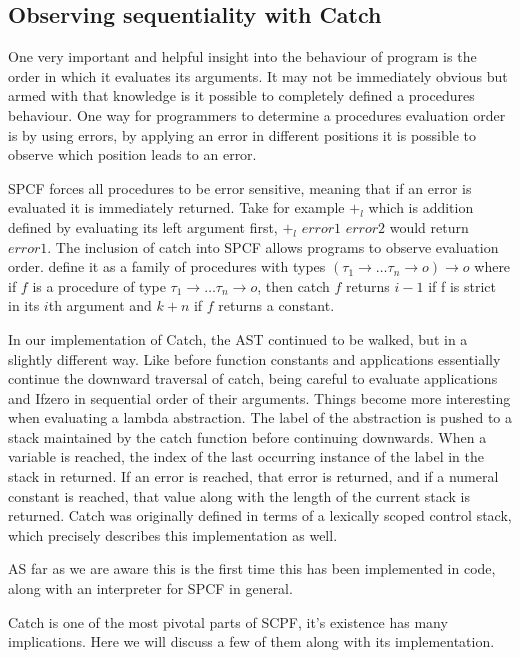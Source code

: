 \documentclass[12pt,a4paper]{report}
\theoremstyle{definition}
\theoremstyle{remark}
\begin{document}
\subsection{Observing sequentiality with Catch}
One very important and helpful insight into the behaviour of program is the order in which it evaluates its arguments. It may not be immediately obvious but armed with that knowledge is it possible to completely defined a procedures behaviour. One way for programmers to determine a procedures evaluation order is by using errors, by applying an error in different positions it is possible to observe which position leads to an error.

SPCF forces all procedures to be error sensitive, meaning that if an error is evaluated it is immediately returned. Take for example $+_l$ which is addition defined by evaluating its left argument first, $+_l$ $error1$ $error2$ would return $error1$. The inclusion of catch into SPCF allows programs to observe evaluation order. \cite{cartwright_1992} define it as a family of procedures with types $(\tau_1 \rightarrow \dots \tau_n \rightarrow o) \rightarrow o$ where if $f$ is a procedure of type $\tau_1 \rightarrow \dots \tau_n \rightarrow o$, then catch $f$ returns $i - 1$ if f is strict in its $i$th argument and $k+n$ if $f$ returns a constant. 

In our implementation of Catch, the AST continued to be walked, but in a slightly different way. Like before function constants and applications essentially continue the downward traversal of catch, being careful to evaluate applications and Ifzero in sequential order of their arguments. Things become more interesting when evaluating a lambda abstraction. The label of the abstraction is pushed to a stack maintained by the catch function before continuing downwards. When a variable is reached, the index of the last occurring instance of the label in the stack in returned. If an error is reached, that error is returned, and if a numeral constant is reached,  that value along with the length of the current stack is returned. Catch was originally defined in terms of a lexically scoped control stack, which precisely describes this implementation as well.

AS far as we are aware this is the first time this has been implemented in code, along with an interpreter for SPCF in general.

Catch is one of the most pivotal parts of SCPF, it's existence has many implications. Here we will discuss a few of them along with its implementation.
\end{document}
